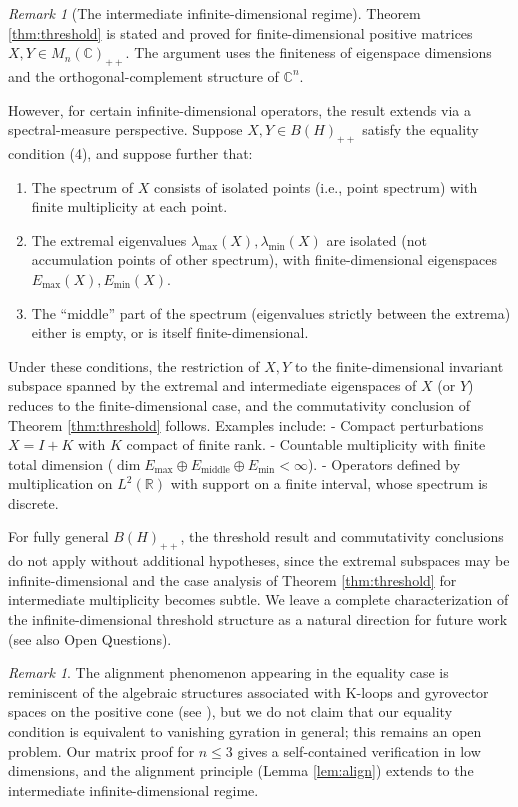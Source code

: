 \documentclass{article}
\theoremstyle{remark}
\newtheorem{remark}[theorem]{Remark}
\begin{document}
\begin{remark}[The intermediate infinite-dimensional regime]
Theorem \ref{thm:threshold} is stated and proved for finite-dimensional positive matrices $X,Y\in M_n(\mathbb{C})_{++}$. The argument uses the finiteness of eigenspace dimensions and the orthogonal-complement structure of $\mathbb{C}^n$. 

However, for certain infinite-dimensional operators, the result extends via a spectral-measure perspective. Suppose $X,Y\in B(H)_{++}$ satisfy the equality condition (4), and suppose further that:
\begin{enumerate}
\item The spectrum of $X$ consists of isolated points (i.e., point spectrum) with finite multiplicity at each point.
\item The extremal eigenvalues $\lambda_{\max}(X),\lambda_{\min}(X)$ are isolated (not accumulation points of other spectrum), with finite-dimensional eigenspaces $E_{\max}(X),E_{\min}(X)$.
\item The ``middle'' part of the spectrum (eigenvalues strictly between the extrema) either is empty, or is itself finite-dimensional.
\end{enumerate}

Under these conditions, the restriction of $X,Y$ to the finite-dimensional invariant subspace spanned by the extremal and intermediate eigenspaces of $X$ (or $Y$) reduces to the finite-dimensional case, and the commutativity conclusion of Theorem \ref{thm:threshold} follows. Examples include: 
- Compact perturbations $X=I+K$ with $K$ compact of finite rank.
- Countable multiplicity with finite total dimension ($\dim E_{\max}\oplus E_{\text{middle}}\oplus E_{\min}<\infty$).
- Operators defined by multiplication on $L^2(\mathbb{R})$ with support on a finite interval, whose spectrum is discrete.

For fully general $B(H)_{++}$, the threshold result and commutativity conclusions do not apply without additional hypotheses, since the extremal subspaces may be infinite-dimensional and the case analysis of Theorem \ref{thm:threshold} for intermediate multiplicity becomes subtle. We leave a complete characterization of the infinite-dimensional threshold structure as a natural direction for future work (see also Open Questions).
\end{remark}

\begin{remark}
The alignment phenomenon appearing in the equality case is reminiscent of the algebraic structures associated with K-loops and gyrovector spaces on the positive cone (see \cite{beneduci2014,abe2015,park2015,kim2016}), but we do not claim that our equality condition is equivalent to vanishing gyration in general; this remains an open problem. Our matrix proof for $n\le3$ gives a self-contained verification in low dimensions, and the alignment principle (Lemma \ref{lem:align}) extends to the intermediate infinite-dimensional regime.
\end{remark}
\end{document}
